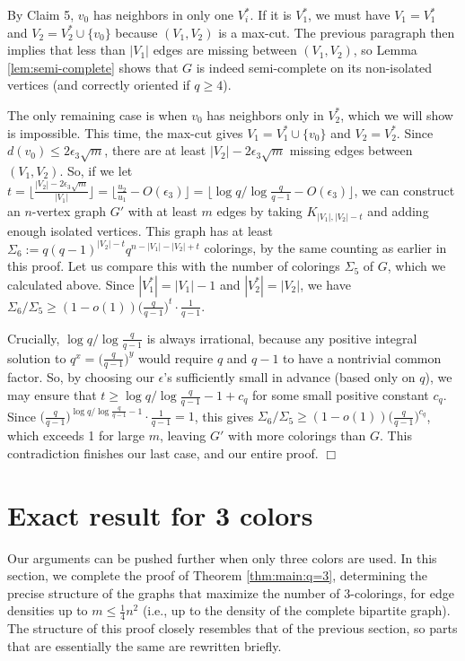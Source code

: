 \documentclass[11pt]{article}
\begin{document}
By Claim 5, $v_0$ has neighbors in only one $V_i^*$.  If it is
$V_1^*$, we must have $V_1 = V_1^*$ and $V_2 = V_2^* \cup \{v_0\}$
because $(V_1, V_2)$ is a max-cut.  The previous paragraph then
implies that less than $|V_1|$ edges are missing between $(V_1, V_2)$,
so Lemma \ref{lem:semi-complete} shows that $G$ is indeed
semi-complete on its non-isolated vertices (and correctly oriented if
$q \geq 4$).

The only remaining case is when $v_0$ has neighbors only in $V_2^*$,
which we will show is impossible.  This time, the max-cut gives $V_1 =
V_1^* \cup \{v_0\}$ and $V_2 = V_2^*$.  Since $d(v_0) \leq 2\epsilon_3
\sqrt{m}$, there are at least $|V_2| - 2\epsilon_3 \sqrt{m}$ missing
edges between $(V_1, V_2)$.  So, if we let $t = \big\lfloor
\frac{|V_2| - 2\epsilon_3 \sqrt{m}}{|V_1|} \big\rfloor = \big\lfloor
\frac{u_2}{u_1} - O(\epsilon_3) \big\rfloor = \big\lfloor \log q /
\log \frac{q}{q-1} - O(\epsilon_3) \big\rfloor$, we can construct an
$n$-vertex graph $G'$ with at least $m$ edges by taking $K_{|V_1|,
  |V_2|-t}$ and adding enough isolated vertices.  This graph has at
least $\Sigma_6 := q(q-1)^{|V_2|-t} q^{n-|V_1|-|V_2|+t}$ colorings, by
the same counting as earlier in this proof.  Let us compare this with
the number of colorings $\Sigma_5$ of $G$, which we calculated above.
Since $|V_1^*| = |V_1| - 1$ and $|V_2^*| = |V_2|$, we have $\Sigma_6 /
\Sigma_5 \geq (1-o(1)) \big( \frac{q}{q-1} \big)^t \cdot
\frac{1}{q-1}$.

Crucially, $\log q / \log \frac{q}{q-1}$ is always irrational, because
any positive integral solution to $q^x = \big(\frac{q}{q-1}\big)^y$
would require $q$ and $q-1$ to have a nontrivial common factor.  So,
by choosing our $\epsilon$'s sufficiently small in advance (based only
on $q$), we may ensure that $t \geq \log q / \log \frac{q}{q-1} - 1 +
c_q$ for some small positive constant $c_q$.  Since
$\big(\frac{q}{q-1}\big)^{\log q / \log \frac{q}{q-1} - 1} \cdot
\frac{1}{q-1} = 1$, this gives $\Sigma_6 / \Sigma_5 \geq (1-o(1))
\big( \frac{q}{q-1} \big)^{c_q}$, which exceeds 1 for large $m$,
leaving $G'$ with more colorings than $G$.  This contradiction
finishes our last case, and our entire proof.  \hfill $\Box$




\section{Exact result for 3 colors}
\label{sec:exact:q=3}

Our arguments can be pushed further when only three colors are used.
In this section, we complete the proof of Theorem \ref{thm:main:q=3},
determining the precise structure of the graphs that maximize the
number of 3-colorings, for edge densities up to $m \leq \frac{1}{4}
n^2$ (i.e., up to the density of the complete bipartite graph).  The
structure of this proof closely resembles that of the previous
section, so parts that are essentially the same are rewritten briefly.
\end{document}
